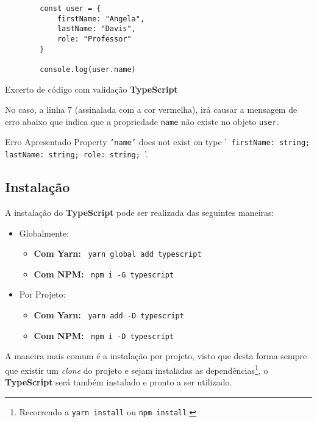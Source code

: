 \begin{longlisting}
	\begin{verbatim}
		const user = {
			firstName: "Angela",
			lastName: "Davis",
			role: "Professor"
		}

		console.log(user.name)
	\end{verbatim}

	\caption{Excerto de código com validação \textbf{TypeScript}}
\end{longlisting}

No caso, a linha 7 (assinalada com a cor vermelha), irá causar a mensagem de erro abaixo que indica que a propriedade \texttt{name} não existe no objeto \texttt{user}.

\begin{errorbox}{Erro Apresentado}
	Property \texttt{'name'} does not exist on type '\texttt{{ firstName: string; lastName: string; role: string; }}'.
\end{errorbox}

\subsection{Instalação}

A instalação do \textbf{TypeScript} pode ser realizada das seguintes maneiras:

\begin{itemize}
	\item Globalmente:
	\begin{itemize}
		\item \textbf{Com Yarn:} ~\texttt{yarn global add typescript}
		\item \textbf{Com NPM:} ~\texttt{npm i -G typescript}
	\end{itemize}
	\item Por Projeto:
	\begin{itemize}
		\item \textbf{Com Yarn:} ~\texttt{yarn add -D typescript}
		\item \textbf{Com NPM:} ~\texttt{npm i -D typescript}
	\end{itemize}
\end{itemize}

A maneira mais comum é a instalação por projeto, visto que desta forma sempre que existir um \textit{clone} do projeto e sejam instaladas as dependências\footnote{Recorrendo a \texttt{yarn install} ou \texttt{npm install}.}, o \textbf{TypeScript} será também instalado e pronto a ser utilizado.

